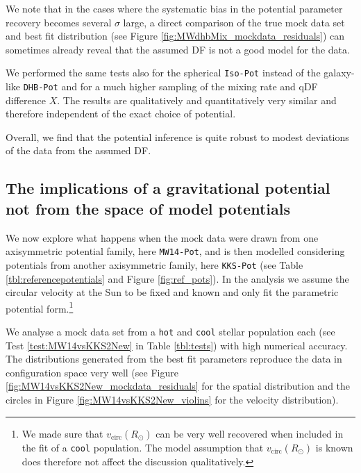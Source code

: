 \documentclass[iop,revtex4,numberedappendix,appendixfloats]{emulateapj}
\begin{document}
We note that in the cases where the systematic bias in the potential parameter recovery becomes several $\sigma$ large, a direct comparison of the true mock data set and best fit distribution (see Figure \ref{fig:MWdhbMix_mockdata_residuals}) can sometimes already reveal that the assumed DF is not a good model for the data.

We performed the same tests also for the spherical \texttt{Iso-Pot} instead of the galaxy-like \texttt{DHB-Pot} and for a much higher sampling of the mixing rate and qDF difference $X$. The results are qualitatively and quantitatively very similar and therefore independent of the exact choice of potential.

Overall, we find that the potential inference is quite robust to modest deviations of the data from the assumed DF. 


\subsection{The implications of a gravitational potential not from the space of model potentials} \label{sec:results_potential}

We now explore what happens when the mock data were drawn from one axisymmetric potential family, here \texttt{MW14-Pot}, and is then modelled considering potentials from another axisymmetric family, here \texttt{KKS-Pot} (see Table \ref{tbl:referencepotentials} and Figure \ref{fig:ref_pots}). In the analysis we assume the circular velocity at the Sun to be fixed and known and only fit the parametric potential form.\footnote{We made sure that $v_\text{circ}(R_\odot)$ can be very well recovered when included in the fit of a \texttt{cool} population. The model assumption that $v_\text{circ}(R_\odot)$ is known does therefore not affect the discussion qualitatively.}

We analyse a mock data set from a \texttt{hot} and \texttt{cool} stellar population each (see Test \ref{test:MW14vsKKS2New} in Table \ref{tbl:tests}) with high numerical accuracy. The distributions generated from the best fit parameters reproduce the data in configuration space very well (see Figure \ref{fig:MW14vsKKS2New_mockdata_residuals} for the spatial distribution and the circles in Figure \ref{fig:MW14vsKKS2New_violins} for the velocity distribution).
\end{document}
